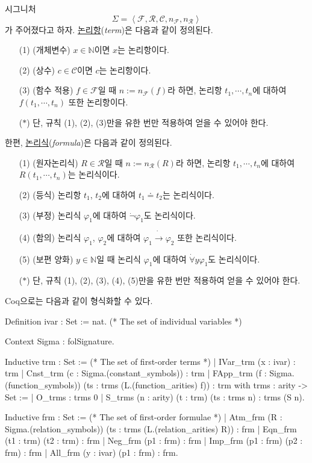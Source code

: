 \documentclass[12pt]{paper}
\begin{document}
시그니처 $$\Sigma = \left\langle \mathcal{F}, \mathcal{R}, \mathcal{C}, n_\mathcal{F} , n_\mathcal{R} \right\rangle$$가 주어졌다고 하자.
\underline{논리항}(\textit{term})은 다음과 같이 정의된다.
\begin{enumerate}
\item [(1)] (개체변수) $x \in \mathbb{N}$이면 $x$는 논리항이다.
\item [(2)] (상수) $c \in \mathcal{C}$이면 $c$는 논리항이다.
\item [(3)] (함수 적용) $f \in \mathcal{F}$일 때 $n := n_\mathcal{F} \left( f \right)$라 하면, 논리항 $t_1, \cdots , t_n$에 대하여 $f \left( t_1 , \cdots , t_n \right)$ 또한 논리항이다.
\item [($\ast$)] 단, 규칙 (1), (2), (3)만을 유한 번만 적용하여 얻을 수 있어야 한다.
\end{enumerate}
한편, \underline{논리식}(\textit{formula})은 다음과 같이 정의된다.
\begin{enumerate}
\item [(1)] (원자논리식) $R \in \mathcal{R}$일 때 $n := n_\mathcal{R} \left( R \right)$라 하면, 논리항 $t_1, \cdots , t_n$에 대하여 $R \left( t_1 , \cdots , t_n \right)$는 논리식이다.
\item [(2)] (등식) 논리항 $t_1$, $t_2$에 대하여 $t_1 \doteq t_2$는 논리식이다. 
\item [(3)] (부정) 논리식 $\varphi_1$에 대하여 $\dot\lnot \varphi_1$도 논리식이다.
\item [(4)] (함의) 논리식 $\varphi_1$, $\varphi_2$에 대하여 $\varphi_1 \dot\to \varphi_2$ 또한 논리식이다.
\item [(5)] (보편 양화) $y \in \mathbb{N}$일 때 논리식 $\varphi_1$에 대하여 $\dot\forall y \varphi_1$도 논리식이다.
\item [($\ast$)] 단, 규칙 (1), (2), (3), (4), (5)만을 유한 번만 적용하여 얻을 수 있어야 한다.
\end{enumerate}
Coq으로는 다음과 같이 형식화할 수 있다.
\begin{coqcode}
Definition ivar : Set := nat. (* The set of individual variables *)

Context {Sigma : folSignature}.

Inductive trm : Set := (* The set of first-order terms *)
  | IVar_trm (x : ivar) : trm
  | Cnst_trm (c : Sigma.(constant_symbols)) : trm
  | FApp_trm (f : Sigma.(function_symbols)) (ts : trms (L.(function_arities) f)) : trm
with trms : arity -> Set :=
  | O_trms : trms 0
  | S_trms (n : arity) (t : trm) (ts : trms n) : trms (S n).

Inductive frm : Set := (* The set of first-order formulae *)
  | Atm_frm (R : Sigma.(relation_symbols)) (ts : trms (L.(relation_arities) R)) : frm
  | Eqn_frm (t1 : trm) (t2 : trm) : frm
  | Neg_frm (p1 : frm) : frm
  | Imp_frm (p1 : frm) (p2 : frm) : frm
  | All_frm (y : ivar) (p1 : frm) : frm.
\end{coqcode}
\end{document}
